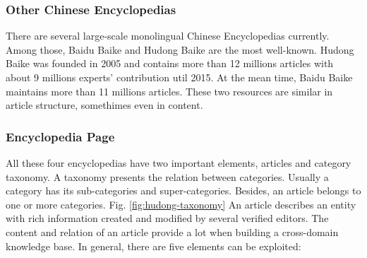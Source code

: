 \documentclass[runningheads,a4paper]{llncs}
\begin{document}
\subsubsection{Other Chinese Encyclopedias}
There are several large-scale monolingual Chinese Encyclopedias currently. Among those, Baidu Baike and Hudong Baike are the most well-known. Hudong Baike was founded in 2005 and contains more than 12 millions articles with about 9 millions experts' contribution util 2015. At the mean time, Baidu Baike maintains more than 11 millions articles. These two resources are similar in article structure, somethimes even in content. 

\subsubsection{Encyclopedia Page}
All these four encyclopedias have two important elements, articles and category taxonomy. A taxonomy presents the relation between categories. Usually a category has its sub-categories and super-categories. Besides, an article belongs to one or more categories. Fig. \ref{fig:hudong-taxonomy} An article describes an entity with rich information created and modified by several verified editors. The content and relation of an article provide a lot when building a cross-domain knowledge base. In general, there are five elements can be exploited:
\end{document}
